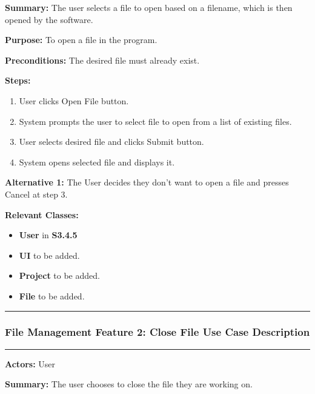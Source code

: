 \documentclass[twoside,letterpaper]{article}
\begin{document}
	\noindent\textbf{Summary:} The user selects a file to open based on a filename, which is then opened by the software. \newline
	
	\noindent\textbf{Purpose:} To open a file in the program. \newline
	
	\noindent\textbf{Preconditions:} The desired file must already exist. \newline
	
	\noindent\textbf{Steps:}
	\begin{enumerate}
		\item User clicks Open File button.
		\item System prompts the user to select file to open from a list of existing files.
		\item User selects desired file and clicks Submit button.
		\item System opens selected file and displays it.
	\end{enumerate}
	\noindent\textbf{Alternative 1:} The User decides they don't want to open a file and presses Cancel at step 3. \newline
	
	\noindent\textbf{Relevant Classes:}
	\begin{itemize}
		\item \textbf{User} in \textbf{S3.4.5}
		\item \textbf{UI} to be added.
		\item \textbf{Project} to be added.
		\item \textbf{File} to be added.
	\end{itemize}
	
	\hrule
	
	\newpage
	
	\subsubsection[File Management Feature 2: Close File Use Case Description]{\rmfamily\bfseries\color{black}
		File Management Feature 2: Close File Use Case Description}
	\hypertarget{RefHeading22059017292}{}
	
	\vspace{2pt}
	\hrule
	\vspace{8pt}
	\textbf{Actors:} User \newline
	
	\noindent\textbf{Summary:} The user chooses to close the file they are working on. \newline
	
\end{document}

